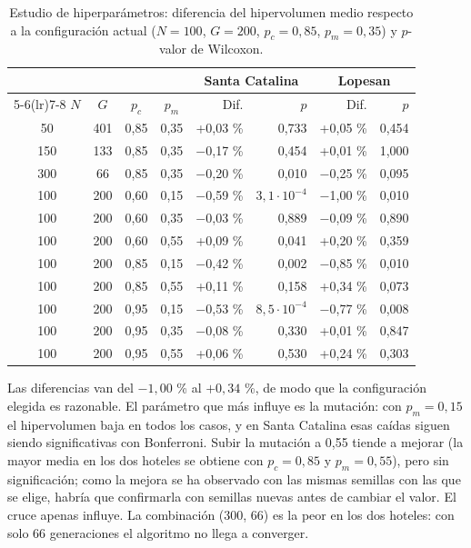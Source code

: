 \begin{table}[H]
\centering
\small
\caption{Estudio de hiperparámetros: diferencia del hipervolumen medio respecto a la configuración actual ($N = 100$, $G = 200$, $p_c = 0{,}85$, $p_m = 0{,}35$) y $p$-valor de Wilcoxon.}
\label{tab:hiperparametros}
\begin{tabular}{@{}cccc rr rr@{}}
\toprule
& & & & \multicolumn{2}{c}{Santa Catalina} & \multicolumn{2}{c}{Lopesan} \\
\cmidrule(lr){5-6}\cmidrule(lr){7-8}
$N$ & $G$ & $p_c$ & $p_m$ & Dif. & $p$ & Dif. & $p$ \\
\midrule
50 & 401 & 0,85 & 0,35 & +0,03 \% & 0,733 & +0,05 \% & 0,454 \\
150 & 133 & 0,85 & 0,35 & $-$0,17 \% & 0,454 & +0,01 \% & 1,000 \\
300 & 66 & 0,85 & 0,35 & $-$0,20 \% & 0,010 & $-$0,25 \% & 0,095 \\
100 & 200 & 0,60 & 0,15 & $-$0,59 \% & $3{,}1\cdot10^{-4}$ & $-$1,00 \% & 0,010 \\
100 & 200 & 0,60 & 0,35 & $-$0,03 \% & 0,889 & $-$0,09 \% & 0,890 \\
100 & 200 & 0,60 & 0,55 & +0,09 \% & 0,041 & +0,20 \% & 0,359 \\
100 & 200 & 0,85 & 0,15 & $-$0,42 \% & 0,002 & $-$0,85 \% & 0,010 \\
100 & 200 & 0,85 & 0,55 & +0,11 \% & 0,158 & +0,34 \% & 0,073 \\
100 & 200 & 0,95 & 0,15 & $-$0,53 \% & $8{,}5\cdot10^{-4}$ & $-$0,77 \% & 0,008 \\
100 & 200 & 0,95 & 0,35 & $-$0,08 \% & 0,330 & +0,01 \% & 0,847 \\
100 & 200 & 0,95 & 0,55 & +0,06 \% & 0,530 & +0,24 \% & 0,303 \\
\bottomrule
\end{tabular}
\end{table}

Las diferencias van del $-1{,}00$ \% al $+0{,}34$ \%, de modo que la configuración elegida es razonable. El parámetro que más influye es la mutación: con $p_m = 0{,}15$ el hipervolumen baja en todos los casos, y en Santa Catalina esas caídas siguen siendo significativas con Bonferroni. Subir la mutación a 0,55 tiende a mejorar (la mayor media en los dos hoteles se obtiene con $p_c = 0{,}85$ y $p_m = 0{,}55$), pero sin significación; como la mejora se ha observado con las mismas semillas con las que se elige, habría que confirmarla con semillas nuevas antes de cambiar el valor. El cruce apenas influye. La combinación (300, 66) es la peor en los dos hoteles: con solo 66 generaciones el algoritmo no llega a converger.

